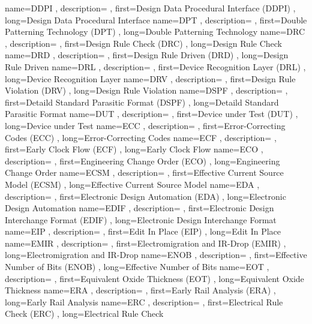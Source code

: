 { name={DDPI}
, description={}
, first={Design Data Procedural Interface (DDPI)}
, long={Design Data Procedural Interface}
}
{ name={DPT}
, description={}
, first={Double Patterning Technology (DPT)}
, long={Double Patterning Technology}
}
{ name={DRC}
, description={}
, first={Design Rule Check (DRC)}
, long={Design Rule Check}
}
{ name={DRD}
, description={}
, first={Design Rule Driven (DRD)}
, long={Design Rule Driven}
}
{ name={DRL}
, description={}
, first={Device Recognition Layer (DRL)}
, long={Device Recognition Layer}
}
{ name={DRV}
, description={}
, first={Design Rule Violation (DRV)}
, long={Design Rule Violation}
}
{ name={DSPF}
, description={}
, first={Detaild Standard Parasitic Format (DSPF)}
, long={Detaild Standard Parasitic Format}
}
{ name={DUT}
, description={}
, first={Device under Test (DUT)}
, long={Device under Test}
}
{ name={ECC}
, description={}
, first={Error-Correcting Codes (ECC)}
, long={Error-Correcting Codes}
}
{ name={ECF}
, description={}
, first={Early Clock Flow (ECF)}
, long={Early Clock Flow}
}
{ name={ECO}
, description={}
, first={Engineering Change Order (ECO)}
, long={Engineering Change Order}
}
{ name={ECSM}
, description={}
, first={Effective Current Source Model (ECSM)}
, long={Effective Current Source Model}
}
{ name={EDA}
, description={}
, first={Electronic Design Automation (EDA)}
, long={Electronic Design Automation}
}
{ name={EDIF}
, description={}
, first={Electronic Design Interchange Format (EDIF)}
, long={Electronic Design Interchange Format}
}
{ name={EIP}
, description={}
, first={Edit In Place (EIP)}
, long={Edit In Place}
}
{ name={EMIR}
, description={}
, first={Electromigration and IR-Drop (EMIR)}
, long={Electromigration and IR-Drop}
}
{ name={ENOB}
, description={}
, first={Effective Number of Bits (ENOB)}
, long={Effective Number of Bits}
}
{ name={EOT}
, description={}
, first={Equivalent Oxide Thickness (EOT)}
, long={Equivalent Oxide Thickness}
}
{ name={ERA}
, description={}
, first={Early Rail Analysis (ERA)}
, long={Early Rail Analysis}
}
{ name={ERC}
, description={}
, first={Electrical Rule Check (ERC)}
, long={Electrical Rule Check}
}
